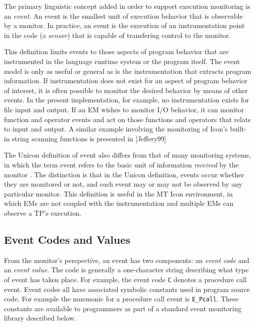 The primary linguistic concept added in order to support execution 
monitoring is an {\em event\/}.  An event is the smallest unit of
execution behavior that is observable by a monitor.  In practice, an
event is the execution of an instrumentation point in the code
(a {\em sensor\/}) 
that is capable of transfering control to the monitor.

This definition limits events to those aspects of program behavior
that are instrumented in the language runtime system or the program
itself.  The event model is only as useful or general as is the
instrumentation that extracts program information.  If instrumentation does
not exist for an aspect of program behavior of interest, it is often
possible to monitor the desired behavior by means of other events. 
In the present implementation, for example, no instrumentation exists
for file input and output.  If an EM wishes to monitor I/O behavior, it
can monitor function and operator events and act on those functions
and operators that relate to input and output.  A similar example
involving the monitoring of Icon's built-in string scanning functions
is presented in [Jeffery99]

The Unicon definition of event also differs from that of many
monitoring systems, in which the term event refers to the basic unit
of information {\em received\/} by the monitor \cite{Bates89}.  The
distinction is that in the Unicon definition, events occur whether
they are monitored or not, and each event may or may not be observed
by any particular monitor.  This definition is useful in the MT
Icon environment, in which EMs are not coupled with the
instrumentation and multiple EMs can observe a TP's execution.

\subsection*{Event Codes and Values}

From the monitor's perspective, an event has two components: an
{\em event code\/} and an {\em event value\/}.  The code is
generally a one-character string describing what type of event
has taken place.  For example, the event code {\tt C} denotes a
procedure call event.  Event codes all have associated symbolic
constants used in program source code.  For example the mnemonic for a
procedure call event is {\tt E\_Pcall}.  These constants are available
to programmers as part of a standard event monitoring library
described below.

